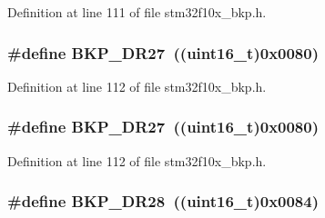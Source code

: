 Definition at line 111 of file stm32f10x\+\_\+bkp.\+h.

\subsubsection[{\texorpdfstring{B\+K\+P\+\_\+\+D\+R27}{BKP_DR27}}]{\setlength{\rightskip}{0pt plus 5cm}\#define B\+K\+P\+\_\+\+D\+R27~(({\bf uint16\+\_\+t})0x0080)}\hypertarget{group___data___backup___register_ga282338412a00b49dc1fde17f8eacbae9}{}\label{group___data___backup___register_ga282338412a00b49dc1fde17f8eacbae9}


Definition at line 112 of file stm32f10x\+\_\+bkp.\+h.

\subsubsection[{\texorpdfstring{B\+K\+P\+\_\+\+D\+R27}{BKP_DR27}}]{\setlength{\rightskip}{0pt plus 5cm}\#define B\+K\+P\+\_\+\+D\+R27~(({\bf uint16\+\_\+t})0x0080)}\hypertarget{group___data___backup___register_ga282338412a00b49dc1fde17f8eacbae9}{}\label{group___data___backup___register_ga282338412a00b49dc1fde17f8eacbae9}


Definition at line 112 of file stm32f10x\+\_\+bkp.\+h.

\subsubsection[{\texorpdfstring{B\+K\+P\+\_\+\+D\+R28}{BKP_DR28}}]{\setlength{\rightskip}{0pt plus 5cm}\#define B\+K\+P\+\_\+\+D\+R28~(({\bf uint16\+\_\+t})0x0084)}\hypertarget{group___data___backup___register_ga02762501319f1b7e7c01b56d45c45cf9}{}\label{group___data___backup___register_ga02762501319f1b7e7c01b56d45c45cf9}



